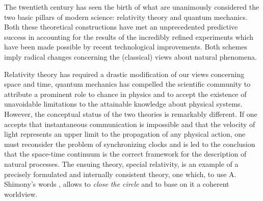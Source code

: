 \documentclass[10pt,a4paper]{article}
\begin{document}
The twentieth century has seen the birth of what are unanimously
considered the two basic pillars of modern science: relativity
theory and quantum mechanics. Both these theoretical constructions
have met an unprecedented predictive success in accounting for the
results of  the incredibly refined experiments which have been
made possible by recent technological improvements. Both schemes
imply radical changes concerning the (classical) views about
natural phenomena.

Relativity theory has required a drastic modification of our views
concerning space and time, quantum mechanics has compelled the
scientific community to attribute a prominent role to chance in
physics and to accept the existence of unavoidable limitations to
the attainable knowledge about physical systems. However, the
conceptual status of the two theories is remarkably different. If
one accepts that instantaneous communication is impossible and
that the velocity of light represents an upper limit to the
propagation of any physical action, one must reconsider the
problem of synchronizing clocks and is led to the conclusion that
the space-time continuum is the correct framework for the
description of natural processes. The ensuing theory, special
relativity, is an example of a precisely formulated and internally
consistent theory, one which, to use A. Shimony's words
\cite{shipcqf}, allows to {\it close the circle} and to base on it
a coherent worldview.
\end{document}
